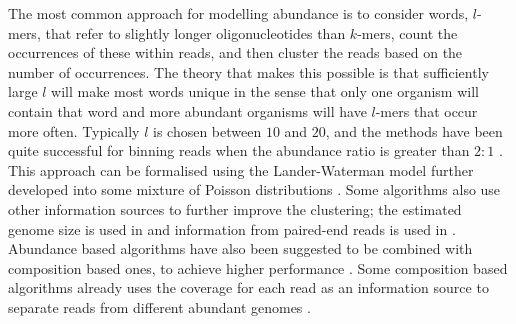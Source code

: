 The most common approach for modelling abundance is to consider words, $l$-mers, that refer to slightly longer oligonucleotides than $k$-mers, count the occurrences of these within reads, and then cluster the reads based on the number of occurrences. The theory that makes this possible is that sufficiently large $l$ will make most words unique in the sense that only one organism will contain that word and more abundant organisms will have $l$-mers that occur more often. Typically $l$ is chosen between $10$ and $20$, and the methods have been quite successful for binning reads when the abundance ratio is greater than $2:1$ \parencite{Wu2011b,Tanaseichuk2012}. This approach can be formalised using the Lander-Waterman model \parencite{Lander1988} further developed into some mixture of Poisson distributions \parencite{Wu2011b,Tanaseichuk2012}. Some algorithms also use other information sources to further improve the clustering; the estimated genome size is used in \parencite{Wu2011b} and information from paired-end reads is used in \parencite{Tanaseichuk2012}. Abundance based algorithms have also been suggested to be combined with composition based ones, to achieve higher performance \parencite{Wu2011b}. Some composition based algorithms already uses the coverage for each read as an information source to separate reads from different abundant genomes  \parencite{Chatterji2008}.

